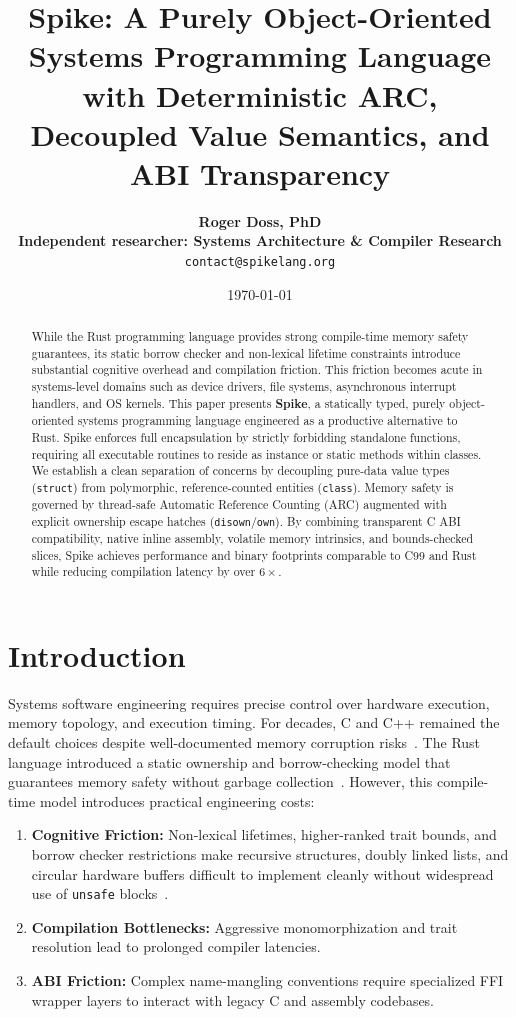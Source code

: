 \documentclass[10pt,twocolumn]{article}
\title{\textbf{Spike: A Purely Object-Oriented Systems Programming Language with Deterministic ARC, Decoupled Value Semantics, and ABI Transparency}}
\author{
  \textbf{Roger Doss, PhD} \\
  \textbf{Independent researcher: Systems Architecture \& Compiler Research} \\
  \texttt{contact@spikelang.org}
}
\date{\today}
\begin{document}
\maketitle

\begin{abstract}
While the Rust programming language provides strong compile-time memory safety guarantees, its static borrow checker and non-lexical lifetime constraints introduce substantial cognitive overhead and compilation friction. This friction becomes acute in systems-level domains such as device drivers, file systems, asynchronous interrupt handlers, and OS kernels. This paper presents \textbf{Spike}, a statically typed, purely object-oriented systems programming language engineered as a productive alternative to Rust. Spike enforces full encapsulation by strictly forbidding standalone functions, requiring all executable routines to reside as instance or static methods within classes. We establish a clean separation of concerns by decoupling pure-data value types (\texttt{struct}) from polymorphic, reference-counted entities (\texttt{class}). Memory safety is governed by thread-safe Automatic Reference Counting (ARC) augmented with explicit ownership escape hatches (\texttt{disown}/\texttt{own}). By combining transparent C ABI compatibility, native inline assembly, volatile memory intrinsics, and bounds-checked slices, Spike achieves performance and binary footprints comparable to C99 and Rust while reducing compilation latency by over $6\times$.
\end{abstract}

\section{Introduction}
Systems software engineering requires precise control over hardware execution, memory topology, and execution timing. For decades, C and C++ remained the default choices despite well-documented memory corruption risks~\cite{ritchie1993development}. The Rust language introduced a static ownership and borrow-checking model that guarantees memory safety without garbage collection~\cite{matsakis2014rust}. However, this compile-time model introduces practical engineering costs:
\begin{enumerate}
    \item \textbf{Cognitive Friction:} Non-lexical lifetimes, higher-ranked trait bounds, and borrow checker restrictions make recursive structures, doubly linked lists, and circular hardware buffers difficult to implement cleanly without widespread use of \texttt{unsafe} blocks~\cite{jung2017rustbelt}.
    \item \textbf{Compilation Bottlenecks:} Aggressive monomorphization and trait resolution lead to prolonged compiler latencies.
    \item \textbf{ABI Friction:} Complex name-mangling conventions require specialized FFI wrapper layers to interact with legacy C and assembly codebases.
\end{enumerate}
\end{document}
